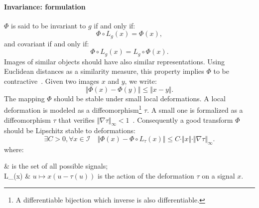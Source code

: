             \paragraph{Invariance: formulation}
                $\Phi$ is said to be invariant to $g$ if and only if:
                \begin{equation}
                    \label{eq::invariance}
                    \Phi\circ L_g\left(x\right) = \Phi(x),
                \end{equation}
                and covariant if and only if:
                \begin{equation}
                    \label{eq::covariance}
                    \Phi\circ L_g\left(x\right) = L_g\circ\Phi(x).
                \end{equation}
                Images of similar objects should have also similar representations.
                Using Euclidean distances as a similarity measure, this property implies $\Phi$ to be contractive~\parencite{bruna2013invariant}.
                Given two images $x$ and $y$, we write:
                \begin{equation}
                    \label{eq::contractive}
                    \Vert \Phi(x) - \Phi(y) \Vert \leq \Vert x-y \Vert.
                \end{equation}
                The mapping $\Phi$ should be stable under small local deformations.
                A local deformation is modeled as a diffeomorphism\footnote{A differentiable bijection which inverse is also differentiable.} $\tau$.
                A small one is formalized as a diffeomorphism $\tau$ that verifies $\Vert\nabla \tau\Vert_\infty < 1$~\parencite{mallat2012group,bruna2013invariant,sifre2013rotation}.
                Consequently a good transform $\Phi$ should be Lipschitz stable to deformations:
                \begin{equation}
                    \label{eq::stable_deformation}
                    \exists C >0, \forall x \in \mathscr{I}\quad \Vert \Phi(x) - \Phi\circ L_\tau(x) \Vert \leq C \cdot \Vert x\Vert \cdot \Vert\nabla \tau\Vert_\infty.
                \end{equation}
                where:
                \begin{conditions}
                     & is the set of all possible signals;\\
                    L_\tau(x) & $u \mapsto x(u - \tau(u))$ is the action of the deformation $\tau$ on a signal $x$.
                \end{conditions}

